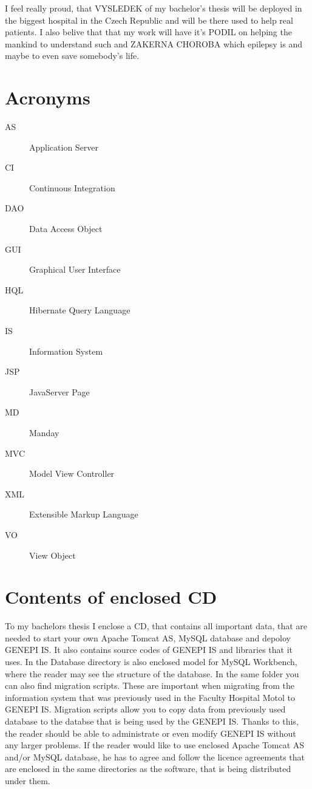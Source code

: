 \documentclass[thesis=B,english]{FITthesis}[2012/10/20]
\begin{document}
\begin{conclusion}
I feel really proud, that VYSLEDEK of my bachelor's thesis will be deployed in the biggest hospital in the Czech Republic and will be there used to help real patients. I also belive that that my work will have it's PODIL on helping the mankind to understand such and ZAKERNA CHOROBA which epilepsy is and maybe to even save somebody's life.

\end{conclusion}




\appendix

\chapter{Acronyms}
\begin{description}
	\item[AS] Application Server
	\item[CI] Continuous Integration
	\item[DAO] Data Access Object
	\item[GUI] Graphical User Interface
	\item[HQL] Hibernate Query Language
	\item[IS] Information System
	\item[JSP] JavaServer Page
	\item[MD] Manday
	\item[MVC] Model View Controller
	\item[XML] Extensible Markup Language
	\item[VO] View Object
\end{description}




\chapter{Contents of enclosed CD}
To my bachelors thesis I enclose a CD, that contains all important data, that are needed to start your own Apache Tomcat AS, MySQL database and depoloy GENEPI IS. It also contains source codes of GENEPI IS and libraries that it uses. In the Database directory is also enclosed model for MySQL Workbench, where the reader may see the structure of the database. In the same folder you can also find migration scripts. These are important when migrating from the information system that was previously used in the Faculty Hospital Motol to GENEPI IS. Migration scripts allow you to copy data from previously used database to the databse that is being used by the GENEPI IS.
Thanks to this, the reader should be able to administrate or even modify GENEPI IS without any larger problems. If the reader would like to use enclosed Apache Tomcat AS and/or MySQL database, he has to agree and follow the licence agreements that are enclosed in the same directories as the software, that is being distributed under them.
\end{document}
